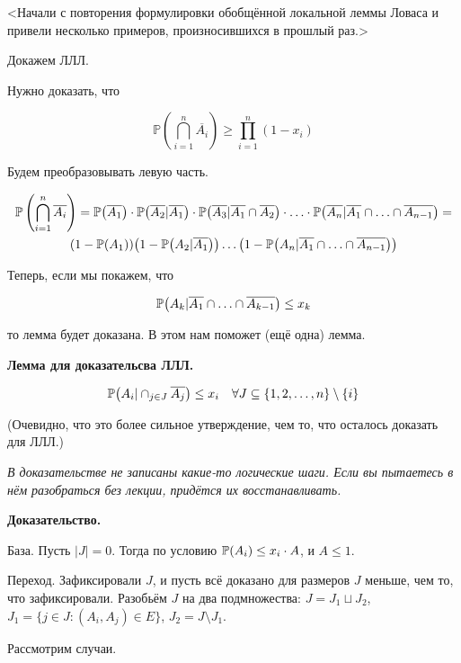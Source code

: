 \documentclass[12pt]{article}
\DeclarePairedDelimiter\autobracket{(}{)}
\newcommand{\br}[1]{\autobracket*{#1}}
\renewcommand{\P}{\mathbb{P}}
\begin{document}
<Начали с повторения формулировки обобщённой локальной леммы Ловаса и привели несколько примеров, произносившихся в прошлый раз.>

Докажем ЛЛЛ.

Нужно доказать, что

\[
\P \left( \bigcap_{i=1}^n \overline{A_i} \right) \geq \prod_{i=1}^n (1 - x_i)
\]

Будем преобразовывать левую часть.

\begin{multline*}
\P \left( \bigcap_{i=1}^n \overline{A_i} \right) =
\P \br{\overline{A_1}} \cdot
\P \br{\overline{A_2} | \overline{A_1}} \cdot
\P \br{\overline{A_3} | \overline{A_1} \cap \overline{A_2}} \cdot \ldots \cdot
\P \br{\overline{A_n} | \overline{A_1} \cap \ldots \cap \overline{A_{n-1}}} = \\
\br{1 - \P \br{A_1}}
\br{1 - \P \br{A_2 | \overline{A_1}}} \ldots
\br{1 - \P \br{A_n | \overline{A_1} \cap \ldots \cap \overline{A_{n-1}}}}
\end{multline*}

Теперь, если мы покажем, что

\[
\P \br{A_k | \overline{A_1} \cap \ldots \cap \overline{A_{k-1}}} \leq x_k
\]

то лемма будет доказана. В этом нам поможет (ещё одна) лемма.

\textbf{Лемма для доказательсва ЛЛЛ.}

\[
\P \br{ A_i | \cap_{j \in J} \overline{A_j}} \leq x_i \quad \forall J \subseteq \{ 1,2, \ldots, n \} \setminus \{ i \}
\]

(Очевидно, что это более сильное утверждение, чем то, что осталось доказать для ЛЛЛ.)

\textit{В доказательстве не записаны какие-то логические шаги. Если вы пытаетесь в нём разобраться без лекции, придётся их восстанавливать.}

\textbf{Доказательство.}

База. Пусть $|J| = 0$. Тогда по условию $\P \br{A_i} \leq x_i \cdot A$, и $A \leq 1$.

Переход. Зафиксировали $J$, и пусть всё доказано для размеров $J$ меньше, чем то, что зафиксировали. Разобьём $J$ на два подмножества: $J = J_1 \sqcup J_2$, $J_1 = \{ j \in J \colon (A_i, A_j) \in E \}$, $J_2 = J \setminus J_1$.

Рассмотрим случаи.
\end{document}
